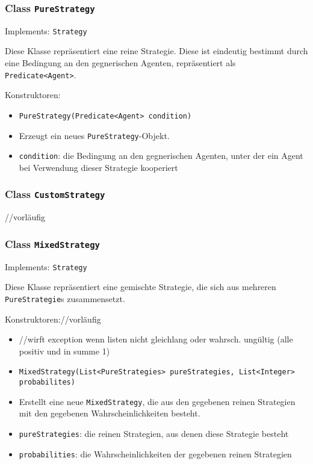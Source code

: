 \documentclass[parskip=full,11pt]{scrartcl}
\begin{document}
\subsubsection{Class \texttt{PureStrategy}}
Implements: \texttt{Strategy}

Diese Klasse repräsentiert eine reine Strategie. Diese ist eindeutig bestimmt durch eine Bedingung an den gegnerischen Agenten, repräsentiert als \texttt{Predicate<Agent>}.

Konstruktoren:
\begin{itemize}\itemsep -10pt
\item \texttt{PureStrategy(Predicate<Agent> condition)}
\item[] Erzeugt ein neues \texttt{PureStrategy}-Objekt.
\item[] \texttt{condition}: die Bedingung an den gegnerischen Agenten, unter der ein Agent bei Verwendung dieser Strategie kooperiert
\end{itemize}

\subsubsection{Class \texttt{CustomStrategy}}
//vorläufig

\subsubsection{Class \texttt{MixedStrategy}}
Implements: \texttt{Strategy}

Diese Klasse repräsentiert eine gemischte Strategie, die sich aus mehreren \texttt{PureStrategie}s zusammensetzt.

Konstruktoren://vorläufig
\begin{itemize}\itemsep -10pt
\item[] //wirft exception wenn listen nicht gleichlang oder wahrsch. ungültig (alle positiv und in summe 1)
\item \texttt{MixedStrategy(List<PureStrategies> pureStrategies, List<Integer> probabilites)}
\item[] Erstellt eine neue \texttt{MixedStrategy}, die aus den gegebenen reinen Strategien mit den gegebenen Wahrscheinlichkeiten besteht.
\item[] \texttt{pureStrategies}: die reinen Strategien, aus denen diese Strategie besteht
\item[] \texttt{probabilities}: die Wahrscheinlichkeiten der gegebenen reinen Strategien
\end{itemize}
\end{document}
